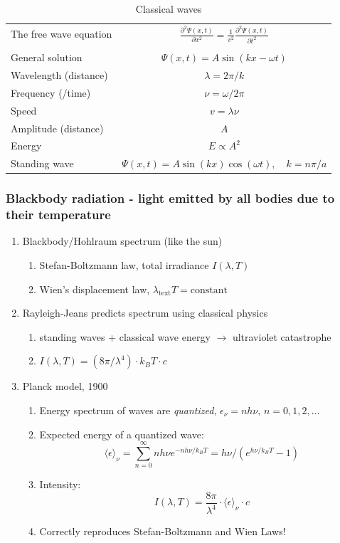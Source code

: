 \documentclass[11pt]{article}
\begin{document}
\begin{table}
\begin{center}
    \caption{Classical waves}
    \begin{tabular}{|lc|}
     \hline
The free wave equation & $\displaystyle \frac{ \partial^2 \Psi(x,t)}{\partial x^2} = \frac{1}{v^2}\frac{\partial^2 \Psi(x,t)}{\partial t^2}$ \\
\\
General solution & \(\Psi(x,t) = A \sin(kx -\omega t)\) \\
Wavelength (distance) & \( \lambda = 2\pi/k \) \\
Frequency (/time) & \( \nu =\omega/2\pi \) \\
Speed & \( v= \lambda \nu \) \\
Amplitude (distance) & \(A\) \\
Energy & \( E \propto A^2 \) \\
Standing wave & \(\Psi(x,t) = A \sin(kx)\cos(\omega t), \quad k =n\pi/a\) \\
\hline
\end{tabular}
\end{center}
\end{table}

\subsubsection{Blackbody radiation - light emitted by all bodies due to their temperature}
\label{sec:org77947d8}
\begin{enumerate}
\item Blackbody/Hohlraum spectrum (like the sun)
\begin{enumerate}
\item Stefan-Boltzmann law, total irradiance \(I(\lambda,T)\)
\item Wien's displacement law, \(\lambda_\mathrm{text}T = \mathrm{constant}\)
\end{enumerate}
\item Rayleigh-Jeans predicts spectrum using classical physics
\begin{enumerate}
\item standing waves + classical wave energy \(\rightarrow\) ultraviolet catastrophe
\item \(I(\lambda, T) = (8\pi/\lambda^4) \cdot k_B T \cdot c\)
\end{enumerate}
\item Planck model, 1900
\begin{enumerate}
\item Energy spectrum of waves are \emph{quantized}, \(\epsilon_\nu=nh\nu\), \(n = 0,1,2, \ldots\)
\item Expected energy of a quantized wave: 
\[\langle \epsilon \rangle_\nu = \sum_{n=0}^\infty nh\nu e^{-nh\nu/k_BT} = h\nu/\left (
          e^{h\nu/k_BT}-1 \right )\]
\item Intensity:
\[I(\lambda, T) = \frac{8\pi}{\lambda^4} \cdot \langle\epsilon \rangle_\nu \cdot c \]
\item Correctly reproduces Stefan-Boltzmann and Wien Laws!
\end{enumerate}
\end{enumerate}
\end{document}
